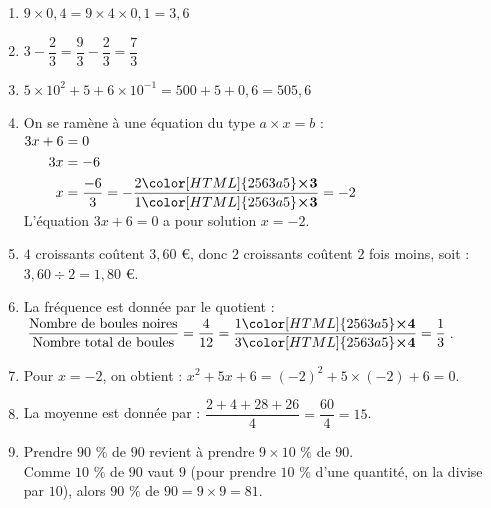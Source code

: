 \documentclass[a4paper,11pt,landscape,exos]{nsi} %
\begin{document}
\begin{multicols}{2}
    \maketitle
\begin{enumerate}[itemsep=.75em]
    \item $9 \times 0{,}4=9\times 4\times 0,1=3{,}6$
\item $3-\dfrac{2}{3}= \dfrac{9}{3}-\dfrac{2}{3}=\dfrac{7}{3}$
\item $5\times10^2+5+6\times 10^{-1}=500+5+0{,}6=505{,}6$
\item On se ramène à une équation du type $a\times x=b$ :\\
          $\begin{aligned}
          3x+6&=0\\
         3x&=-6\\
                              x&=\dfrac{-6}{3}=-\dfrac{2{\color[HTML]{2563a5}\boldsymbol{\times3}} }{1{\color[HTML]{2563a5}\boldsymbol{\times3}}}=-2
         \end{aligned}$\\
          
        
          
          L'équation $3x+6=0$ a pour solution $x=-2$.
\item $4$ croissants coûtent  $3{,}60$ €, donc
                       $2$ croissants coûtent $2$ fois moins, soit : \\
                       $3{,}60\div 2=1{,}80$ €.
\item La fréquence est donnée par le quotient : $\dfrac{\text{Nombre de boules noires}}{\text{Nombre total de boules}}=\dfrac{4}{12}=\dfrac{1{\color[HTML]{2563a5}\boldsymbol{\times4}} }{3{\color[HTML]{2563a5}\boldsymbol{\times4}}}=\dfrac{1}{3}$.
\item 
            Pour $x=-2$, on obtient : $x^2+5x+6=(-2)^2+5\times (-2)+6=0$.
                      
\item La moyenne est donnée par : $\dfrac{2+4+28+26}{4}=\dfrac{60}{4}=15$.
\item           Prendre $90$ $\%$  de $90$ revient à prendre $9\times 10$ $\%$  de $90$.\\
            Comme $10$ $\%$  de $90$ vaut $9$ (pour prendre $10$ $\%$  d'une quantité, on la divise par $10$), alors
            $90$ $\%$ de $90=9\times 9=81$.
           

\end{enumerate}
\end{multicols}
\end{document}
